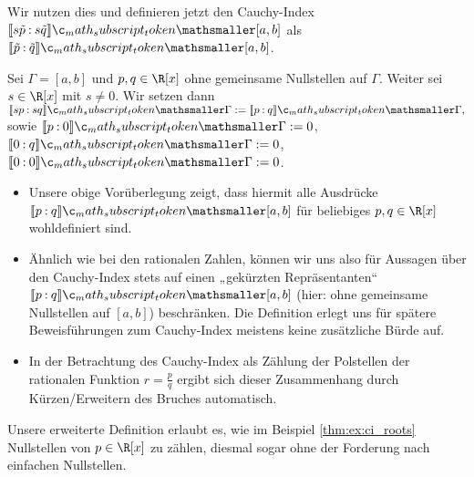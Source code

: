 \documentclass{mythesis}
\begin{document}
Wir nutzen dies und definieren jetzt den Cauchy-Index $\Index{[a,b]}{s\tilde p}{s \tilde q}$ als $\Index{[a,b]}{\tilde p}{\tilde q}$.

\begin{definition} \label{thm:def:ci_common-roots}
    Sei $\Gamma = [a, b]$ und $p, q \in \R[x]$ ohne gemeinsame Nullstellen auf $\Gamma$.
    Weiter sei $s \in \R[x]$ mit $s \neq 0$.
%
    Wir setzen dann
    \begin{math}
        \Index{\Gamma}{sp}{sq} := \Index{\Gamma}{p}{q},
    \end{math}
    sowie $\Index{\Gamma}{p}{0} := 0$, $\Index{\Gamma}{0}{q} := 0$, $\Index{\Gamma}{0}{0} := 0$.
    \begin{note}
        \begin{itemize}
            \item
                Unsere obige Vorüberlegung zeigt, dass hiermit alle Ausdrücke $\Index{[a,b]}{p}{q}$ für beliebiges $p, q \in \R[x]$ wohldefiniert sind.
            \item
                Ähnlich wie bei den rationalen Zahlen, können wir uns also für Aussagen über den Cauchy-Index stets auf einen „gekürzten Repräsentanten“ $\Index{[a,b]}{p}{q}$ (hier: ohne gemeinsame Nullstellen auf $[a,b]$) beschränken.
                Die Definition erlegt uns für spätere Beweisführungen zum Cauchy-Index meistens keine zusätzliche Bürde auf.
            \item
                In der Betrachtung des Cauchy-Index als Zählung der Polstellen der rationalen Funktion $r = \frac{p}{q}$ ergibt sich dieser Zusammenhang durch Kürzen/Erweitern des Bruches automatisch.
        \end{itemize}
    \end{note}
\end{definition}

Unsere erweiterte Definition erlaubt es, wie im Beispiel \ref{thm:ex:ci_roots} Nullstellen von $p \in \R[x]$ zu zählen, diesmal sogar ohne der Forderung nach einfachen Nullstellen.
\end{document}
